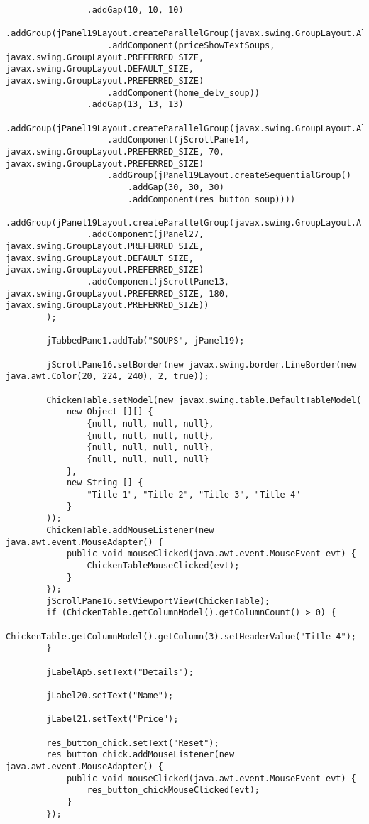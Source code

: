 \documentclass[12pt,a4paper]{article}
\begin{document}
\begin{lstlisting}
                .addGap(10, 10, 10)
                .addGroup(jPanel19Layout.createParallelGroup(javax.swing.GroupLayout.Alignment.LEADING)
                    .addComponent(priceShowTextSoups, javax.swing.GroupLayout.PREFERRED_SIZE, javax.swing.GroupLayout.DEFAULT_SIZE, javax.swing.GroupLayout.PREFERRED_SIZE)
                    .addComponent(home_delv_soup))
                .addGap(13, 13, 13)
                .addGroup(jPanel19Layout.createParallelGroup(javax.swing.GroupLayout.Alignment.LEADING)
                    .addComponent(jScrollPane14, javax.swing.GroupLayout.PREFERRED_SIZE, 70, javax.swing.GroupLayout.PREFERRED_SIZE)
                    .addGroup(jPanel19Layout.createSequentialGroup()
                        .addGap(30, 30, 30)
                        .addComponent(res_button_soup))))
            .addGroup(jPanel19Layout.createParallelGroup(javax.swing.GroupLayout.Alignment.TRAILING)
                .addComponent(jPanel27, javax.swing.GroupLayout.PREFERRED_SIZE, javax.swing.GroupLayout.DEFAULT_SIZE, javax.swing.GroupLayout.PREFERRED_SIZE)
                .addComponent(jScrollPane13, javax.swing.GroupLayout.PREFERRED_SIZE, 180, javax.swing.GroupLayout.PREFERRED_SIZE))
        );

        jTabbedPane1.addTab("SOUPS", jPanel19);

        jScrollPane16.setBorder(new javax.swing.border.LineBorder(new java.awt.Color(20, 224, 240), 2, true));

        ChickenTable.setModel(new javax.swing.table.DefaultTableModel(
            new Object [][] {
                {null, null, null, null},
                {null, null, null, null},
                {null, null, null, null},
                {null, null, null, null}
            },
            new String [] {
                "Title 1", "Title 2", "Title 3", "Title 4"
            }
        ));
        ChickenTable.addMouseListener(new java.awt.event.MouseAdapter() {
            public void mouseClicked(java.awt.event.MouseEvent evt) {
                ChickenTableMouseClicked(evt);
            }
        });
        jScrollPane16.setViewportView(ChickenTable);
        if (ChickenTable.getColumnModel().getColumnCount() > 0) {
            ChickenTable.getColumnModel().getColumn(3).setHeaderValue("Title 4");
        }

        jLabelAp5.setText("Details");

        jLabel20.setText("Name");

        jLabel21.setText("Price");

        res_button_chick.setText("Reset");
        res_button_chick.addMouseListener(new java.awt.event.MouseAdapter() {
            public void mouseClicked(java.awt.event.MouseEvent evt) {
                res_button_chickMouseClicked(evt);
            }
        });


\end{lstlisting}
\end{document}

